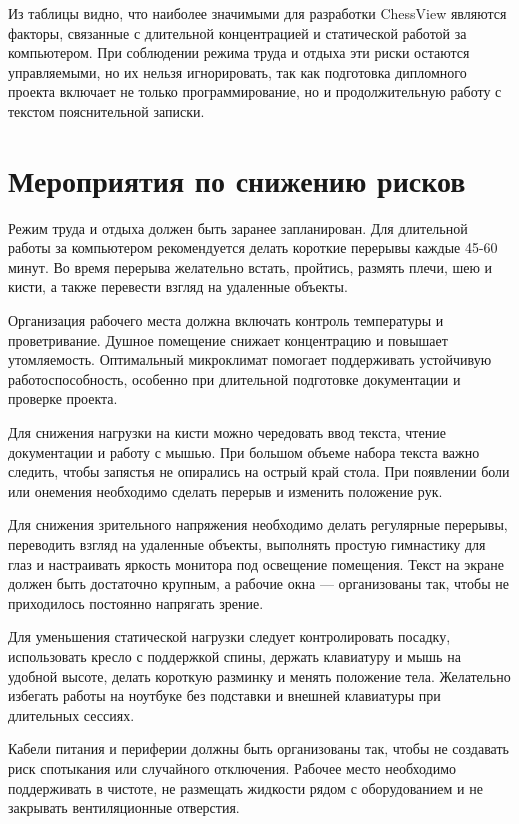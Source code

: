 Из таблицы видно, что наиболее значимыми для разработки ChessView являются факторы, связанные с длительной концентрацией и статической работой за компьютером. При соблюдении режима труда и отдыха эти риски остаются управляемыми, но их нельзя игнорировать, так как подготовка дипломного проекта включает не только программирование, но и продолжительную работу с текстом пояснительной записки.


\section{Мероприятия по снижению рисков}

Режим труда и отдыха должен быть заранее запланирован. Для длительной работы за компьютером рекомендуется делать короткие перерывы каждые 45-60 минут. Во время перерыва желательно встать, пройтись, размять плечи, шею и кисти, а также перевести взгляд на удаленные объекты.


Организация рабочего места должна включать контроль температуры и проветривание. Душное помещение снижает концентрацию и повышает утомляемость. Оптимальный микроклимат помогает поддерживать устойчивую работоспособность, особенно при длительной подготовке документации и проверке проекта.


Для снижения нагрузки на кисти можно чередовать ввод текста, чтение документации и работу с мышью. При большом объеме набора текста важно следить, чтобы запястья не опирались на острый край стола. При появлении боли или онемения необходимо сделать перерыв и изменить положение рук.


Для снижения зрительного напряжения необходимо делать регулярные перерывы, переводить взгляд на удаленные объекты, выполнять простую гимнастику для глаз и настраивать яркость монитора под освещение помещения. Текст на экране должен быть достаточно крупным, а рабочие окна — организованы так, чтобы не приходилось постоянно напрягать зрение.


Для уменьшения статической нагрузки следует контролировать посадку, использовать кресло с поддержкой спины, держать клавиатуру и мышь на удобной высоте, делать короткую разминку и менять положение тела. Желательно избегать работы на ноутбуке без подставки и внешней клавиатуры при длительных сессиях.


Кабели питания и периферии должны быть организованы так, чтобы не создавать риск спотыкания или случайного отключения. Рабочее место необходимо поддерживать в чистоте, не размещать жидкости рядом с оборудованием и не закрывать вентиляционные отверстия.



